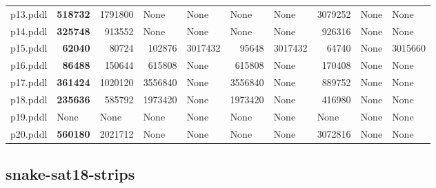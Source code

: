 \documentclass{article}
\begin{document}
\begin{tabular}{@{}lrrrrrrrrr@{}}
p13.pddl & \textbf{518732} & 1791800 & \multicolumn{1}{|l|}{None} & \multicolumn{1}{|l|}{None} & \multicolumn{1}{|l|}{None} & \multicolumn{1}{|l|}{None} & 3079252 & \multicolumn{1}{|l|}{None} & \multicolumn{1}{|l|}{None} \\
p14.pddl & \textbf{325748} & 913552 & \multicolumn{1}{|l|}{None} & \multicolumn{1}{|l|}{None} & \multicolumn{1}{|l|}{None} & \multicolumn{1}{|l|}{None} & 926316 & \multicolumn{1}{|l|}{None} & \multicolumn{1}{|l|}{None} \\
p15.pddl & \textbf{62040} & 80724 & 102876 & 3017432 & 95648 & 3017432 & 64740 & \multicolumn{1}{|l|}{None} & 3015660 \\
p16.pddl & \textbf{86488} & 150644 & 615808 & \multicolumn{1}{|l|}{None} & 615808 & \multicolumn{1}{|l|}{None} & 170408 & \multicolumn{1}{|l|}{None} & \multicolumn{1}{|l|}{None} \\
p17.pddl & \textbf{361424} & 1020120 & 3556840 & \multicolumn{1}{|l|}{None} & 3556840 & \multicolumn{1}{|l|}{None} & 889752 & \multicolumn{1}{|l|}{None} & \multicolumn{1}{|l|}{None} \\
p18.pddl & \textbf{235636} & 585792 & 1973420 & \multicolumn{1}{|l|}{None} & 1973420 & \multicolumn{1}{|l|}{None} & 416980 & \multicolumn{1}{|l|}{None} & \multicolumn{1}{|l|}{None} \\
p19.pddl & \multicolumn{1}{|l|}{None} & \multicolumn{1}{|l|}{None} & \multicolumn{1}{|l|}{None} & \multicolumn{1}{|l|}{None} & \multicolumn{1}{|l|}{None} & \multicolumn{1}{|l|}{None} & \multicolumn{1}{|l|}{None} & \multicolumn{1}{|l|}{None} & \multicolumn{1}{|l|}{None} \\
p20.pddl & \textbf{560180} & 2021712 & \multicolumn{1}{|l|}{None} & \multicolumn{1}{|l|}{None} & \multicolumn{1}{|l|}{None} & \multicolumn{1}{|l|}{None} & 3072816 & \multicolumn{1}{|l|}{None} & \multicolumn{1}{|l|}{None} \\
\end{tabular}

\hypertarget{search_start_memory-snake-sat18-strips}{}
\subsection*{snake-sat18-strips}
\end{document}
